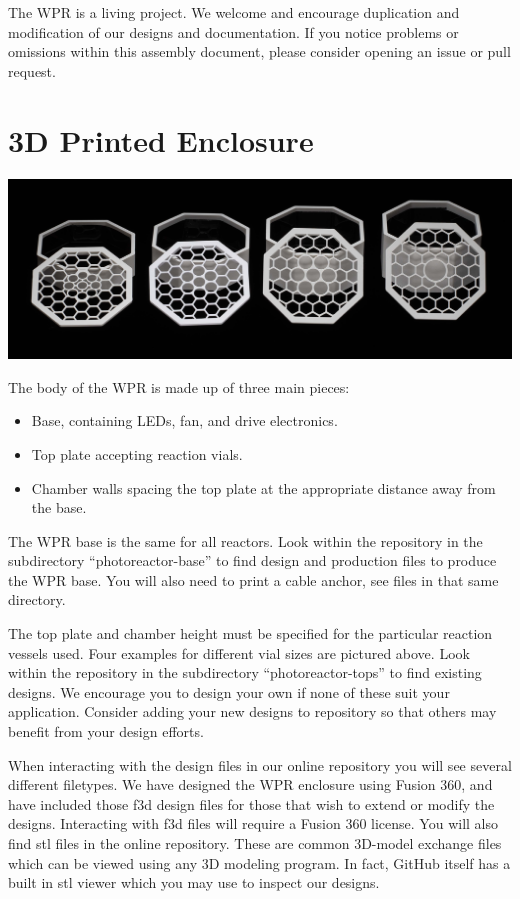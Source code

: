 \documentclass[11pt]{article}
\let\stdsection\section
\renewcommand\section{\clearpage\stdsection}
\begin{document}
The WPR is a living project.
We welcome and encourage duplication and modification of our designs and documentation.
If you notice problems or omissions within this assembly document, please consider opening an issue or pull request.

\section{3D Printed Enclosure} \label{SEC:enclosure}

\includegraphics[width=\textwidth]{"./3dp-coverat.jpg"}

The body of the WPR is made up of three main pieces:

\begin{itemize}
    \item Base, containing LEDs, fan, and drive electronics.
    \item Top plate accepting reaction vials.
    \item Chamber walls spacing the top plate at the appropriate distance away from the base.
\end{itemize}

The WPR base is the same for all reactors.
Look within the repository in the subdirectory ``photoreactor-base'' to find design and production files to produce the WPR base.
You will also need to print a cable anchor, see files in that same directory.

The top plate and chamber height must be specified for the particular reaction vessels used.
Four examples for different vial sizes are pictured above.
Look within the repository in the subdirectory ``photoreactor-tops'' to find existing designs.
We encourage you to design your own if none of these suit your application.
Consider adding your new designs to repository so that others may benefit from your design efforts.

When interacting with the design files in our online repository you will see several different filetypes.
We have designed the WPR enclosure using Fusion 360, and have included those f3d design files for those that wish to extend or modify the designs.
Interacting with f3d files will require a Fusion 360 license.
You will also find stl files in the online repository.
These are common 3D-model exchange files which can be viewed using any 3D modeling program.
In fact, GitHub itself has a built in stl viewer which you may use to inspect our designs.
\end{document}

